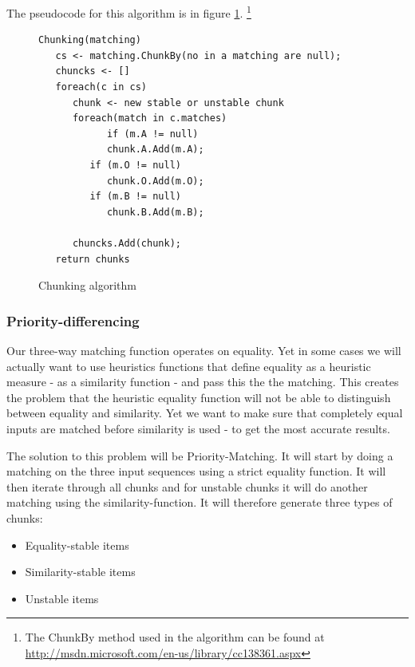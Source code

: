 \documentclass[11pt]{article}
\begin{document}
The pseudocode for this algorithm is in figure \ref{CunkingAlgorithm}. \footnote{The ChunkBy method used in the algorithm can be found at \url{http://msdn.microsoft.com/en-us/library/cc138361.aspx}}

\begin{figure}
\begin{verbatim}
Chunking(matching)
   cs <- matching.ChunkBy(no in a matching are null);
   chuncks <- []
   foreach(c in cs)
      chunk <- new stable or unstable chunk
      foreach(match in c.matches)
            if (m.A != null)
            chunk.A.Add(m.A);
         if (m.O != null)
            chunk.O.Add(m.O);
         if (m.B != null)
            chunk.B.Add(m.B);

      chuncks.Add(chunk);
   return chunks
\end{verbatim}
\caption{Chunking algorithm}
  \label{CunkingAlgorithm}
\end{figure}

\subsubsection{Priority-differencing}
Our three-way matching function operates on equality. Yet in some cases we will actually want to use heuristics functions that define equality as a heuristic measure - as a similarity function - and pass this the the matching. This creates the problem that the heuristic equality function will not be able to distinguish between equality and similarity. Yet we want to make sure that completely equal inputs are matched before similarity is used - to get the most accurate results.

The solution to this problem will be Priority-Matching. It will start by doing a matching on the three input sequences using a strict equality function. It will then iterate through all chunks and for unstable chunks it will do another matching using the similarity-function. It will therefore generate three types of chunks:

\begin{itemize}
   \item Equality-stable items
   \item Similarity-stable items
   \item Unstable items
\end{itemize}
\end{document}

